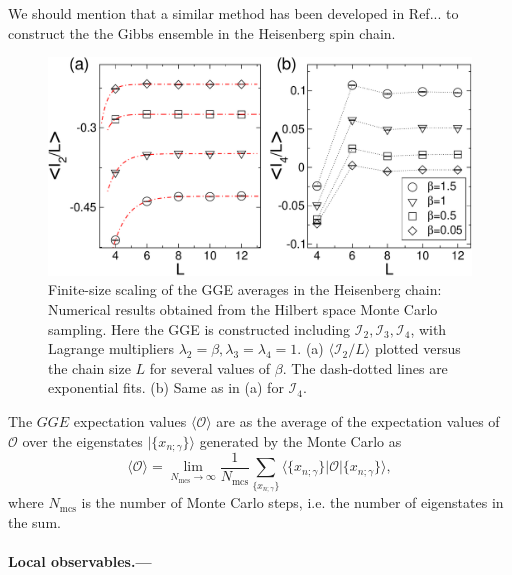 \documentclass[twocolumn,superscriptaddress,prb,10pt]{revtex4-1}
\begin{document}
We should mention that a similar method has been developed in Ref... to construct 
the the Gibbs ensemble in the Heisenberg spin chain. 

\begin{figure}[t]
\includegraphics*[width=0.93\linewidth]{./draft_figs/fig3}
\caption{Finite-size scaling of the GGE averages in the Heisenberg chain: Numerical results 
 obtained from the Hilbert space Monte Carlo sampling. Here the GGE is constructed including 
 ${\mathcal I}_2, {\mathcal I}_3, {\mathcal I}_4$, with Lagrange multipliers $\lambda_2=\beta,
 \lambda_3=\lambda_4=1$. (a) $\langle {\mathcal I}_2/L\rangle$ plotted versus the chain size 
 $L$ for several values of $\beta$. The dash-dotted lines are exponential fits. (b) Same as 
 in (a) for ${\mathcal I}_4$.
}
\label{fig-2}
\end{figure}

The $GGE$ expectation values $\langle{\mathcal O}\rangle$ are as the average 
of the expectation values of ${\mathcal O}$ over the eigenstates $|\{x_{n;\gamma}\}
\rangle$ generated by the Monte Carlo as 
%
\begin{equation}
\label{gge-mc}
\langle{\mathcal O}\rangle=\lim\limits_{N_\textrm{mcs}\to\infty}\frac{1}
{N_\textrm{mcs}}\sum\limits_{\{x_{n;\gamma}\}}\langle \{x_{n;\gamma}\}|{\mathcal O}
|\{x_{n;\gamma}\}\rangle,
\end{equation}
%
where $N_{\textrm{mcs}}$ is the number of Monte Carlo steps, i.e. the number of 
eigenstates in the sum. 



\paragraph*{Local observables.---} 
\end{document}
